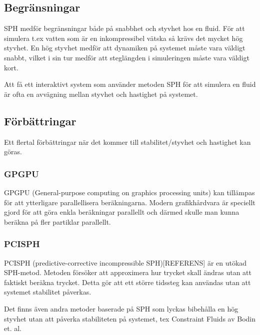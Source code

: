 \documentclass[a4paper,12pt,oneside,final]{extarticle}
\begin{document}
\subsection{Begränsningar}
SPH medför begränsningar både på snabbhet och styvhet hos en fluid.
För att simulera t.ex vatten som är en inkompressibel vätska så krävs det mycket hög styvhet.
En hög styvhet medför att dynamiken på systemet måste vara väldigt snabbt, vilket i sin tur medför att steglängden i simuleringen måste vara väldigt kort.

Att få ett interaktivt system som använder metoden SPH för att simulera en fluid är ofta en avvägning mellan styvhet och hastighet på systemet. 
\subsection{Förbättringar}
Ett flertal förbättringar när det kommer till stabilitet/styvhet och hastighet kan göras.
\subsubsection{GPGPU}
GPGPU (General-purpose computing on graphics processing units) kan tillämpas för att ytterligare parallellisera beräkningarna.
Modern grafikhårdvara är speciellt gjord för att göra enkla beräkningar parallellt och därmed skulle man kunna beräkna på fler partiklar parallellt.

\subsubsection{PCISPH}
PCISPH (predictive-corrective incompressible SPH)[REFERENS] är en utökad SPH-metod.
Metoden försöker att approximera hur trycket skall ändras utan att faktiskt beräkna trycket.
Detta gör att ett större tidssteg kan användas utan att systemet stabilitet påverkas.

Det finns även andra metoder baserade på SPH som lyckas bibehålla en hög styvhet utan att påverka stabiliteten på systemet, tex Constraint Fluids\cite{bodin} av Bodin et. al.


\end{document}
